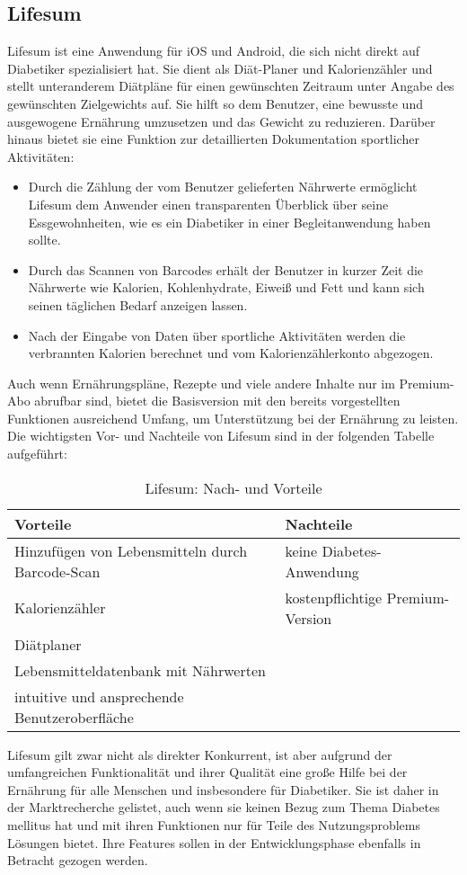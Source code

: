 	\subsection{Lifesum}
	Lifesum ist eine Anwendung für iOS und Android, die sich nicht direkt auf Diabetiker spezialisiert hat. Sie dient als Diät-Planer und Kalorienzähler und stellt unteranderem Diätpläne für einen gewünschten Zeitraum unter Angabe des gewünschten Zielgewichts auf. Sie hilft so dem Benutzer, eine bewusste und ausgewogene Ernährung umzusetzen und das Gewicht zu reduzieren. Darüber hinaus bietet sie eine Funktion zur detaillierten Dokumentation sportlicher Aktivitäten:
	\begin{itemize}
		\item Durch die Zählung der vom Benutzer gelieferten Nährwerte ermöglicht Lifesum dem Anwender einen transparenten Überblick über seine Essgewohnheiten, wie es ein Diabetiker in einer Begleitanwendung haben sollte. 
		\item Durch das Scannen von Barcodes erhält der Benutzer in kurzer Zeit die Nährwerte wie Kalorien, Kohlenhydrate, Eiweiß und Fett und kann sich seinen täglichen Bedarf anzeigen lassen.
		\item Nach der Eingabe von Daten über sportliche Aktivitäten werden die verbrannten Kalorien berechnet und vom Kalorienzählerkonto abgezogen.
	\end{itemize}
	Auch wenn Ernährungspläne, Rezepte und viele andere Inhalte nur im Premium-Abo abrufbar sind, bietet die Basisversion mit den bereits vorgestellten Funktionen ausreichend Umfang, um Unterstützung bei der Ernährung zu leisten.\newline
	Die wichtigsten Vor- und Nachteile von Lifesum sind in der folgenden Tabelle aufgeführt\cite{L}:
	\begin{table}[H]
		\setlength{\tabcolsep}{12pt}
		\centering
		\begin{tabular}{p{6cm}|p{6cm}}
			\toprule
			\textbf{Vorteile} & \textbf{Nachteile}\\
			\hline
			Hinzufügen von Lebensmitteln durch Barcode-Scan & keine Diabetes-Anwendung\\
			\hline
			Kalorienzähler & kostenpflichtige Premium-Version\\
			\hline
			Diätplaner & \\
			\hline
			Lebensmitteldatenbank mit Nährwerten & \\
			\hline
			intuitive und ansprechende Benutzeroberfläche & \\
			\bottomrule
		\end{tabular}
		\captionsetup{justification=centering}
		\caption{Lifesum: Nach- und Vorteile}
		\label{tab:Lifesum}
	\end{table}
	\setlength{\parindent}{0pt}Lifesum gilt zwar nicht als direkter Konkurrent, ist aber aufgrund der umfangreichen Funktionalität und ihrer Qualität eine große Hilfe bei der Ernährung für alle Menschen und insbesondere für Diabetiker. Sie ist daher in der Marktrecherche gelistet, auch wenn sie keinen Bezug zum Thema Diabetes mellitus hat und mit ihren Funktionen nur für Teile des Nutzungsproblems Lösungen bietet. Ihre Features sollen in der Entwicklungsphase ebenfalls in Betracht gezogen werden.

